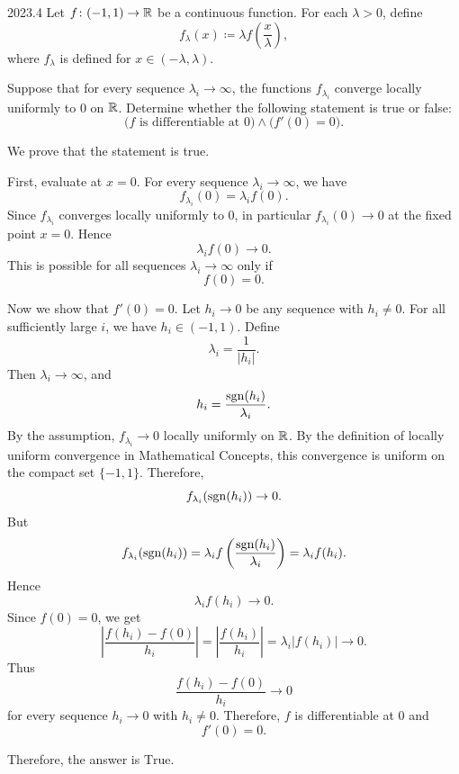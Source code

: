     \begin{pastproblem}{2023.4}
        Let $f\colon(-1,1)\to\mathbb{R}$ be a continuous function. For each $\lambda>0$, define
        \[
            f_\lambda(x)
            \coloneqq
            \lambda f\left(\frac{x}{\lambda}\right),
        \]
        where $f_\lambda$ is defined for $x\in(-\lambda,\lambda)$.

        Suppose that for every sequence $\lambda_i\to\infty$, the functions $f_{\lambda_i}$ converge
        locally uniformly to $0$ on $\mathbb{R}$. Determine whether the following statement is true or
        false:
        \[
            \bigl(f\text{ is differentiable at }0\bigr)
            \land
            \bigl(f'(0)=0\bigr).
        \]
    \end{pastproblem}

    \begin{solution}
        We prove that the statement is true.

        First, evaluate at $x=0$. For every sequence $\lambda_i\to\infty$, we have
        \[
            f_{\lambda_i}(0)
            =
            \lambda_i f(0).
        \]
        Since $f_{\lambda_i}$ converges locally uniformly to $0$, in particular $f_{\lambda_i}(0)\to
        0$ at the fixed point $x=0$. Hence
        \[
            \lambda_i f(0)\to 0.
        \]
        This is possible for all sequences $\lambda_i\to\infty$ only if
        \[
            f(0)=0.
        \]

        Now we show that $f'(0)=0$. Let $h_i\to 0$ be any sequence with $h_i\neq 0$. For all
        sufficiently large $i$, we have $h_i\in(-1,1)$. Define
        \[
            \lambda_i=\frac{1}{|h_i|}.
        \]
        Then $\lambda_i\to\infty$, and
        \[
            h_i=\frac{\operatorname{sgn}(h_i)}{\lambda_i}.
        \]
        By the assumption, $f_{\lambda_i}\to 0$ locally uniformly on $\mathbb{R}$. By the
        definition of locally uniform convergence in Mathematical Concepts, this
        convergence is uniform on the compact set $\{-1,1\}$. Therefore,
        \[
            f_{\lambda_i}(\operatorname{sgn}(h_i))\to 0.
        \]
        But
        \[
            f_{\lambda_i}(\operatorname{sgn}(h_i))
            =
            \lambda_i
            f\left(
                \frac{\operatorname{sgn}(h_i)}{\lambda_i}
            \right)
            =
            \lambda_i f(h_i).
        \]
        Hence
        \[
            \lambda_i f(h_i)\to 0.
        \]
        Since $f(0)=0$, we get
        \[
            \left|
                \frac{f(h_i)-f(0)}{h_i}
            \right|
            =
            \left|
                \frac{f(h_i)}{h_i}
            \right|
            =
            \lambda_i |f(h_i)|
            \to 0.
        \]
        Thus
        \[
            \frac{f(h_i)-f(0)}{h_i}\to 0
        \]
        for every sequence $h_i\to 0$ with $h_i\neq 0$. Therefore, $f$ is differentiable at $0$ and
        \[
            f'(0)=0.
        \]

        Therefore, the answer is $\boxed{\text{True}}$.
    \end{solution}

